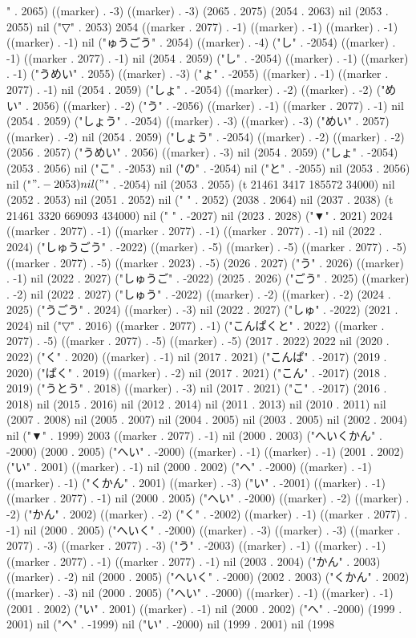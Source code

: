 " . 2065) ((marker) . -3) ((marker) . -3) (2065 . 2075) (2054 . 2063) nil (2053 . 2055) nil ("▽" . 2053) 2054 ((marker . 2077) . -1) ((marker) . -1) ((marker) . -1) ((marker) . -1) nil ("ゅうごう" . 2054) ((marker) . -4) ("し" . -2054) ((marker) . -1) ((marker . 2077) . -1) nil (2054 . 2059) ("し" . -2054) ((marker) . -1) ((marker) . -1) ("うめい" . 2055) ((marker) . -3) ("ょ" . -2055) ((marker) . -1) ((marker . 2077) . -1) nil (2054 . 2059) ("しょ" . -2054) ((marker) . -2) ((marker) . -2) ("めい" . 2056) ((marker) . -2) ("う" . -2056) ((marker) . -1) ((marker . 2077) . -1) nil (2054 . 2059) ("しょう" . -2054) ((marker) . -3) ((marker) . -3) ("めい" . 2057) ((marker) . -2) nil (2054 . 2059) ("しょう" . -2054) ((marker) . -2) ((marker) . -2) (2056 . 2057) ("うめい" . 2056) ((marker) . -3) nil (2054 . 2059) ("しょ" . -2054) (2053 . 2056) nil ("こ" . -2053) nil ("の" . -2054) nil ("と" . -2055) nil (2053 . 2056) nil ("$" . -2053) nil ("$" . -2054) nil (2053 . 2055) (t 21461 3417 185572 34000) nil (2052 . 2053) nil (2051 . 2052) nil (" " . 2052) (2038 . 2064) nil (2037 . 2038) (t 21461 3320 669093 434000) nil (" " . -2027) nil (2023 . 2028) ("▼" . 2021) 2024 ((marker . 2077) . -1) ((marker . 2077) . -1) ((marker . 2077) . -1) nil (2022 . 2024) ("しゅうごう" . -2022) ((marker) . -5) ((marker) . -5) ((marker . 2077) . -5) ((marker . 2077) . -5) ((marker . 2023) . -5) (2026 . 2027) ("う" . 2026) ((marker) . -1) nil (2022 . 2027) ("しゅうご" . -2022) (2025 . 2026) ("ごう" . 2025) ((marker) . -2) nil (2022 . 2027) ("しゅう" . -2022) ((marker) . -2) ((marker) . -2) (2024 . 2025) ("うごう" . 2024) ((marker) . -3) nil (2022 . 2027) ("しゅ" . -2022) (2021 . 2024) nil ("▽" . 2016) ((marker . 2077) . -1) ("こんぱくと" . 2022) ((marker . 2077) . -5) ((marker . 2077) . -5) ((marker) . -5) (2017 . 2022) 2022 nil (2020 . 2022) ("く" . 2020) ((marker) . -1) nil (2017 . 2021) ("こんぱ" . -2017) (2019 . 2020) ("ぱく" . 2019) ((marker) . -2) nil (2017 . 2021) ("こん" . -2017) (2018 . 2019) ("うとう" . 2018) ((marker) . -3) nil (2017 . 2021) ("こ" . -2017) (2016 . 2018) nil (2015 . 2016) nil (2012 . 2014) nil (2011 . 2013) nil (2010 . 2011) nil (2007 . 2008) nil (2005 . 2007) nil (2004 . 2005) nil (2003 . 2005) nil (2002 . 2004) nil ("▼" . 1999) 2003 ((marker . 2077) . -1) nil (2000 . 2003) ("へいくかん" . -2000) (2000 . 2005) ("へい" . -2000) ((marker) . -1) ((marker) . -1) (2001 . 2002) ("い" . 2001) ((marker) . -1) nil (2000 . 2002) ("へ" . -2000) ((marker) . -1) ((marker) . -1) ("くかん" . 2001) ((marker) . -3) ("い" . -2001) ((marker) . -1) ((marker . 2077) . -1) nil (2000 . 2005) ("へい" . -2000) ((marker) . -2) ((marker) . -2) ("かん" . 2002) ((marker) . -2) ("く" . -2002) ((marker) . -1) ((marker . 2077) . -1) nil (2000 . 2005) ("へいく" . -2000) ((marker) . -3) ((marker) . -3) ((marker . 2077) . -3) ((marker . 2077) . -3) ("う" . -2003) ((marker) . -1) ((marker) . -1) ((marker . 2077) . -1) ((marker . 2077) . -1) nil (2003 . 2004) ("かん" . 2003) ((marker) . -2) nil (2000 . 2005) ("へいく" . -2000) (2002 . 2003) ("くかん" . 2002) ((marker) . -3) nil (2000 . 2005) ("へい" . -2000) ((marker) . -1) ((marker) . -1) (2001 . 2002) ("い" . 2001) ((marker) . -1) nil (2000 . 2002) ("へ" . -2000) (1999 . 2001) nil ("へ" . -1999) nil ("い" . -2000) nil (1999 . 2001) nil (1998 